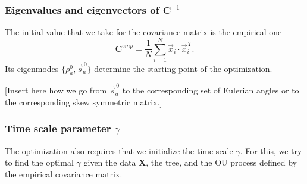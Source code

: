 \documentclass[preprint,amsmath,amssymb,superscriptaddress,showpacs,pre]{revtex4-1}
\let\originalleft\left
\let\originalright\right
\renewcommand{\left}{\mathopen{}\mathclose\bgroup\originalleft}
\renewcommand{\right}{\aftergroup\egroup\originalright}
\def\vx{\vec x}
\newcommand{\vsa}{\vec{s}_a}
\begin{document}
	\subsubsection{Eigenvalues and eigenvectors of $\mathbf{C}^{-1}$} %
	\label{ssub:eigenvalues_and_eigenvectors}

	The initial value that we take for the covariance matrix is the empirical one
	\begin{equation*}
		\mathbf{C}^{emp} = \frac{1}{N}\sum_{i=1}^{N}\vx_i \cdot\vx_i^{\,T}.
	\end{equation*}
	Its eigenmodes $\{\rho^0_a, \vsa^{\,0}\}$ determine the starting point of the optimization. 

	[Insert here how we go from $\vsa^{\,0}$ to the corresponding set of Eulerian angles or to the corresponding skew symmetric matrix.]
	




	\subsubsection{Time scale parameter $\gamma$}

	The optimization also requires that we initialize the time scale $\gamma$. 
	For this, we try to find the optimal $\gamma$ given the data $\mathbf{X}$, the tree, and the OU process defined by the empirical covariance matrix. 
\end{document}
